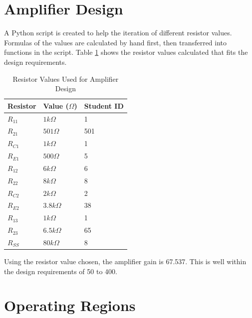 \documentclass{article}
\begin{document}
\section{Amplifier Design}

A Python script is created to help the iteration of different resistor values.
Formulas of the values are calculated by hand first, then transferred into functions in the script.
Table \ref{tab:resistor-values} shows the resistor values calculated that fits the design requirements.

\begin{table}[H]
    \caption{Resistor Values Used for Amplifier Design}
    \label{tab:resistor-values}
    \centering
    \begin{tabular}{l l l}
        \hline
        Resistor & Value ($\Omega$) & Student ID \\
        \hline
        $R_{11}$ & $1 k\Omega$      & 1          \\
        $R_{21}$ & $501 \Omega$     & 501        \\
        $R_{C1}$ & $1 k\Omega$      & 1          \\
        $R_{E1}$ & $500 \Omega$     & 5          \\
        \hline
        $R_{12}$ & $6 k\Omega$      & 6          \\
        $R_{22}$ & $8 k\Omega$      & 8          \\
        $R_{C2}$ & $2 k\Omega$      & 2          \\
        $R_{E2}$ & $3.8 k\Omega$    & 38         \\
        \hline
        $R_{13}$ & $1 k\Omega$      & 1          \\
        $R_{23}$ & $6.5 k\Omega$    & 65         \\
        $R_{SS}$ & $80 k\Omega$     & 8          \\
        \hline
    \end{tabular}
\end{table}

Using the resistor value chosen, the amplifier gain is 67.537.
This is well within the design requirements of 50 to 400.







\section{Operating Regions}
\end{document}
